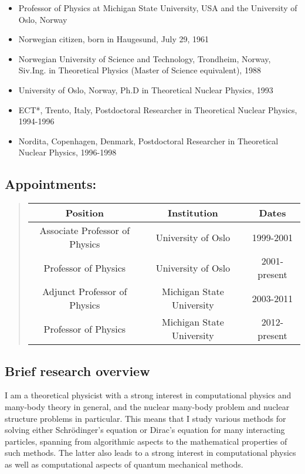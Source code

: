 \documentclass[%
oneside,                 %
final,                   %
10pt]{article}
\begin{document}
\begin{itemize}
\item Professor of Physics at Michigan State University, USA and the University of Oslo, Norway

\item Norwegian citizen, born in Haugesund, July 29, 1961

\item Norwegian University of Science and Technology, Trondheim, Norway,  Siv.Ing. in Theoretical Physics (Master of Science equivalent),  1988 

\item University of Oslo, Norway,  Ph.D in Theoretical Nuclear Physics, 1993

\item ECT*, Trento, Italy,  Postdoctoral Researcher in Theoretical Nuclear Physics,  1994-1996

\item Nordita, Copenhagen, Denmark, Postdoctoral Researcher in Theoretical Nuclear Physics, 1996-1998
\end{itemize}

\noindent
\subsection*{Appointments:}


\begin{quote}
\begin{tabular}{ccc}
\hline
\multicolumn{1}{c}{ Position } & \multicolumn{1}{c}{ Institution } & \multicolumn{1}{c}{ Dates } \\
\hline
Associate Professor of Physics & University of Oslo        & 1999-2001    \\
Professor of Physics           & University of Oslo        & 2001-present \\
Adjunct Professor of Physics   & Michigan State University & 2003-2011    \\
Professor of Physics           & Michigan State University & 2012-present \\
\hline
\end{tabular}
\end{quote}

\noindent

\subsection*{Brief research overview}

I am a theoretical physicist with a strong interest in 
computational physics and many-body theory in general, and 
the nuclear many-body problem and nuclear structure problems in particular. 
This means that I study various methods for solving either Schrödinger's equation or 
Dirac's equation for many interacting particles, spanning from 
algorithmic aspects to the mathematical properties of such methods. 
The latter also leads to a strong interest in computational 
physics as well as computational aspects of quantum mechanical methods. 
\end{document}
